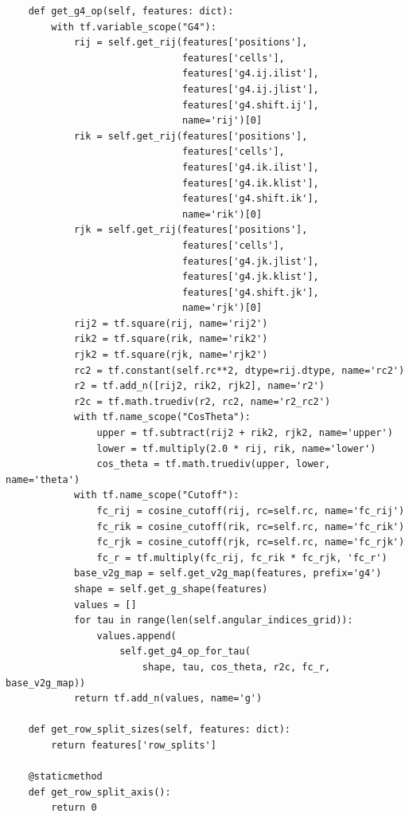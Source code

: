 \documentclass[preprint]{revtex4-2}
\begin{document}
\begin{verbatim}
    def get_g4_op(self, features: dict):
        with tf.variable_scope("G4"):
            rij = self.get_rij(features['positions'],
                               features['cells'],
                               features['g4.ij.ilist'],
                               features['g4.ij.jlist'],
                               features['g4.shift.ij'],
                               name='rij')[0]
            rik = self.get_rij(features['positions'],
                               features['cells'],
                               features['g4.ik.ilist'],
                               features['g4.ik.klist'],
                               features['g4.shift.ik'],
                               name='rik')[0]
            rjk = self.get_rij(features['positions'],
                               features['cells'],
                               features['g4.jk.jlist'],
                               features['g4.jk.klist'],
                               features['g4.shift.jk'],
                               name='rjk')[0]
            rij2 = tf.square(rij, name='rij2')
            rik2 = tf.square(rik, name='rik2')
            rjk2 = tf.square(rjk, name='rjk2')
            rc2 = tf.constant(self.rc**2, dtype=rij.dtype, name='rc2')
            r2 = tf.add_n([rij2, rik2, rjk2], name='r2')
            r2c = tf.math.truediv(r2, rc2, name='r2_rc2')
            with tf.name_scope("CosTheta"):
                upper = tf.subtract(rij2 + rik2, rjk2, name='upper')
                lower = tf.multiply(2.0 * rij, rik, name='lower')
                cos_theta = tf.math.truediv(upper, lower, name='theta')
            with tf.name_scope("Cutoff"):
                fc_rij = cosine_cutoff(rij, rc=self.rc, name='fc_rij')
                fc_rik = cosine_cutoff(rik, rc=self.rc, name='fc_rik')
                fc_rjk = cosine_cutoff(rjk, rc=self.rc, name='fc_rjk')
                fc_r = tf.multiply(fc_rij, fc_rik * fc_rjk, 'fc_r')
            base_v2g_map = self.get_v2g_map(features, prefix='g4')
            shape = self.get_g_shape(features)
            values = []
            for tau in range(len(self.angular_indices_grid)):
                values.append(
                    self.get_g4_op_for_tau(
                        shape, tau, cos_theta, r2c, fc_r, base_v2g_map))
            return tf.add_n(values, name='g')

    def get_row_split_sizes(self, features: dict):
        return features['row_splits']

    @staticmethod
    def get_row_split_axis():
        return 0


\end{verbatim}
\end{document}
